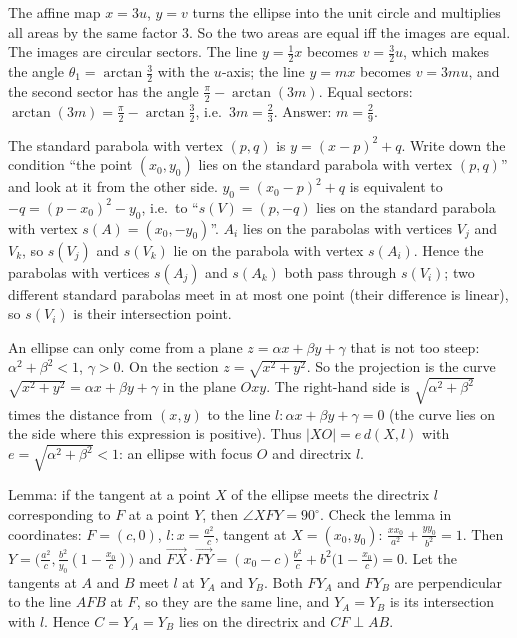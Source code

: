 \documentclass[11pt,a4paper]{article}
\begin{document}

 The affine map $x=3u$, $y=v$ turns the ellipse into the unit circle and multiplies all areas by the same factor $3$. So the two areas are equal iff the images are equal.
 The images are circular sectors. The line $y=\frac12x$ becomes $v=\frac32u$, which makes the angle $\theta_1=\arctan\frac32$ with the $u$-axis; the line $y=mx$ becomes $v=3mu$, and the second sector has the angle $\frac\pi2-\arctan(3m)$.
 Equal sectors: $\arctan(3m)=\frac\pi2-\arctan\frac32$, i.e.\ $3m=\frac23$. Answer: $m=\frac29$.

 The standard parabola with vertex $(p,q)$ is $y=(x-p)^2+q$. Write down the condition ``the point $(x_0,y_0)$ lies on the standard parabola with vertex $(p,q)$'' and look at it from the other side.
 $y_0=(x_0-p)^2+q$ is equivalent to $-q=(p-x_0)^2-y_0$, i.e.\ to ``$s(V)=(p,-q)$ lies on the standard parabola with vertex $s(A)=(x_0,-y_0)$''.
 $A_i$ lies on the parabolas with vertices $V_j$ and $V_k$, so $s(V_j)$ and $s(V_k)$ lie on the parabola with vertex $s(A_i)$. Hence the parabolas with vertices $s(A_j)$ and $s(A_k)$ both pass through $s(V_i)$; two different standard parabolas meet in at most one point (their difference is linear), so $s(V_i)$ is their intersection point.

 An ellipse can only come from a plane $z=\alpha x+\beta y+\gamma$ that is not too steep: $\alpha^2+\beta^2<1$, $\gamma>0$. On the section $z=\sqrt{x^2+y^2}$.
 So the projection is the curve $\sqrt{x^2+y^2}=\alpha x+\beta y+\gamma$ in the plane $Oxy$. The right-hand side is $\sqrt{\alpha^2+\beta^2}$ times the distance from $(x,y)$ to the line $l\colon\alpha x+\beta y+\gamma=0$ (the curve lies on the side where this expression is positive).
 Thus $|XO|=e\,d(X,l)$ with $e=\sqrt{\alpha^2+\beta^2}<1$: an ellipse with focus $O$ and directrix $l$.

 Lemma: if the tangent at a point $X$ of the ellipse meets the directrix $l$ corresponding to $F$ at a point $Y$, then $\angle XFY=90^\circ$.
 Check the lemma in coordinates: $F=(c,0)$, $l\colon x=\frac{a^2}c$, tangent at $X=(x_0,y_0)$: $\frac{xx_0}{a^2}+\frac{yy_0}{b^2}=1$. Then $Y=\bigl(\frac{a^2}c,\frac{b^2}{y_0}(1-\frac{x_0}c)\bigr)$ and $\overrightarrow{FX}\cdot\overrightarrow{FY}=(x_0-c)\frac{b^2}c+b^2\bigl(1-\frac{x_0}c\bigr)=0$.
 Let the tangents at $A$ and $B$ meet $l$ at $Y_A$ and $Y_B$. Both $FY_A$ and $FY_B$ are perpendicular to the line $AFB$ at $F$, so they are the same line, and $Y_A=Y_B$ is its intersection with $l$. Hence $C=Y_A=Y_B$ lies on the directrix and $CF\perp AB$.
\end{document}
